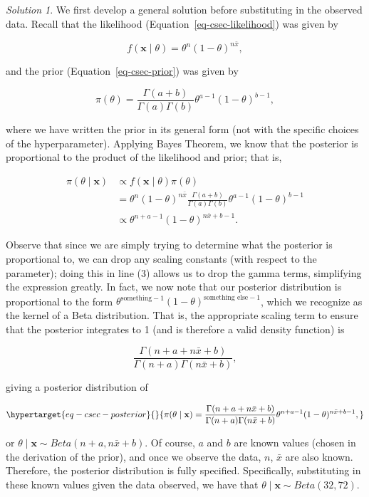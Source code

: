 \documentclass[
  letterpaper,
  DIV=11,
  numbers=noendperiod]{scrreprt}
\theoremstyle{definition}
\theoremstyle{plain}
\theoremstyle{definition}
\theoremstyle{remark}
\newtheorem*{solution}{Solution}
\begin{document}
\begin{solution}

We first develop a general solution before substituting in the observed
data. Recall that the likelihood (Equation~\ref{eq-csec-likelihood}) was
given by

\[f(\mathbf{x} \mid \theta) = \theta^n (1 - \theta)^{n \bar{x}},\]

and the prior (Equation~\ref{eq-csec-prior}) was given by

\[\pi(\theta) = \frac{\Gamma(a+b)}{\Gamma(a) \Gamma(b)} \theta^{a-1} (1 - \theta)^{b-1},\]

where we have written the prior in its general form (not with the
specific choices of the hyperparameter). Applying Bayes Theorem, we know
that the posterior is proportional to the product of the likelihood and
prior; that is,

\[
\begin{aligned}
  \pi(\theta \mid \mathbf{x}) 
    &\propto f(\mathbf{x} \mid \theta) \pi(\theta) \\
    &= \theta^n (1 - \theta)^{n \bar{x}} \frac{\Gamma(a + b)}{\Gamma(a) \Gamma(b)} \theta^{a-1} (1 - \theta)^{b - 1} \\
    &\propto \theta^{n + a - 1} (1 - \theta)^{n\bar{x} + b - 1}.
\end{aligned}
\]

Observe that since we are simply trying to determine what the posterior
is proportional to, we can drop any scaling constants (with respect to
the parameter); doing this in line (3) allows us to drop the gamma
terms, simplifying the expression greatly. In fact, we now note that our
posterior distribution is proportional to the form
\(\theta^{\text{something} - 1} (1 - \theta)^{\text{something else} - 1}\),
which we recognize as the kernel of a Beta distribution. That is, the
appropriate scaling term to ensure that the posterior integrates to 1
(and is therefore a valid density function) is

\[\frac{\Gamma(n + a + n\bar{x} + b)}{\Gamma(n + a)\Gamma(n\bar{x} + b)},\]

giving a posterior distribution of

\begin{equation}\protect\hypertarget{eq-csec-posterior}{}{\pi(\theta \mid \mathbf{x}) = \frac{\Gamma(n + a + n\bar{x} + b)}{\Gamma(n + a)\Gamma(n\bar{x} + b)} \theta^{n + a - 1} (1 - \theta)^{n\bar{x} + b - 1},}\label{eq-csec-posterior}\end{equation}

or \(\theta \mid \mathbf{x} \sim Beta(n + a, n\bar{x} + b)\). Of course,
\(a\) and \(b\) are known values (chosen in the derivation of the
prior), and once we observe the data, \(n\), \(\bar{x}\) are also known.
Therefore, the posterior distribution is fully specified. Specifically,
substituting in these known values given the data observed, we have that
\(\theta \mid \mathbf{x} \sim Beta(32, 72)\).

\end{solution}
\end{document}
